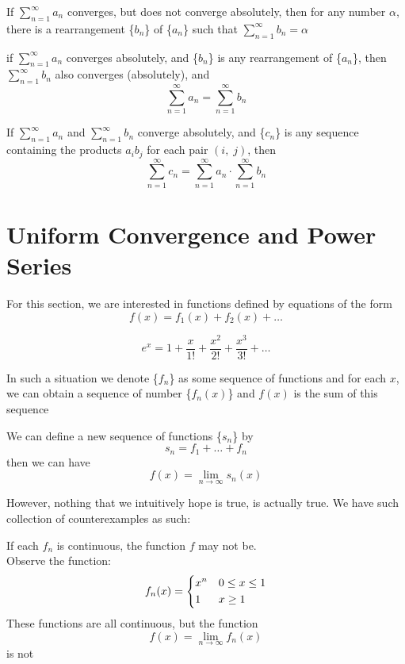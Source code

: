 \begin{theorem}
    If $\sum_{n=1}^\infty a_n$ converges, but does not converge absolutely, then for any number $\alpha$, there is a rearrangement \{$b_n$\} of \{$a_n$\} such that $\sum_{n=1}^\infty b_n = \alpha$
\end{theorem}
\begin{theorem}
    if $\sum_{n=1}^\infty a_n$ converges absolutely, and \{$b_n$\} is any rearrangement of \{$a_n$\}, then $\sum_{n=1}^\infty b_n$ also converges (absolutely), and 
    $$\sum_{n=1}^\infty a_n = \sum_{n=1}^\infty b_n$$
\end{theorem}
\begin{theorem}
    If $\sum_{n=1}^\infty a_n$ and $\sum_{n=1}^\infty b_n$ converge absolutely, and \{$c_n$\} is any sequence containing the products $a_ib_j$ for each pair $(i,\; j)$, then 
    $$\sum_{n=1}^\infty c_n = \sum_{n=1}^\infty a_n \cdot \sum_{n=1}^\infty b_n$$
\end{theorem} \newpage

\section{Uniform Convergence and Power Series}
For this section, we are interested in functions defined by equations of the form 
$$f(x) = f_1(x) + f_2(x) + \dots $$
\begin{eg}
    $$e^x = 1 + \frac{x}{1!} + \frac{x^2}{2!}+\frac{x^3}{3!} + \dots$$
\end{eg} 
In such a situation we denote \{$f_n$\} as some sequence of functions and for each $x$, we can obtain a sequence of number \{$f_n(x)$\} and $f(x)$ is the sum of this sequence \bigskip

We can define a new sequence of functions \{$s_n$\} by 
$$s_n = f_1 + \dots + f_n$$
then  we can have
$$f(x) = \lim _{n\to \infty} s_n(x)$$ \bigskip

However, nothing that we intuitively hope is true, is actually true. We have such collection of counterexamples as such:
\begin{ceg}
    If each $f_n$ is continuous, the function $f$ may not be.\\
    Observe the function:
    $$f_n(x) =
    \begin{dcases}
        x^n & 0 \leq x \leq 1 \\
        1  & x \geq 1
    \end{dcases}$$
    These functions are all continuous, but the function 
    $$f(x) = \lim_{n\to\infty}f_n(x)$$
    is not
\end{ceg} \bigskip

